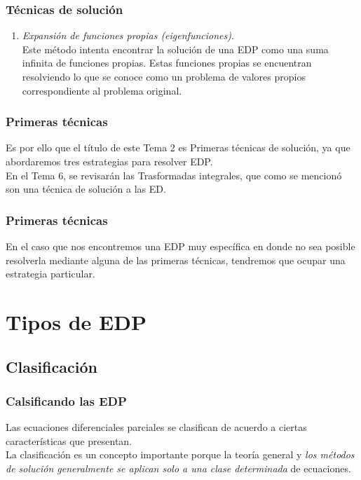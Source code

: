 \documentclass[12pt]{beamer}
\begin{document}
\begin{frame}
\frametitle{Técnicas de solución}
\begin{enumerate}
\conti
\item \emph{Expansión de funciones propias (eigenfunciones)}.
\\
\bigskip
Este método intenta encontrar la solución de una EDP como una suma infinita de funciones propias. Estas funciones propias se encuentran resolviendo lo que se conoce como un problema de valores propios correspondiente al problema original.
\end{enumerate}
\end{frame}
\begin{frame}
\frametitle{Primeras técnicas}
Es por ello que el título de este Tema 2 es Primeras técnicas de solución, ya que abordaremos tres estrategias para resolver EDP.
\\
\bigskip
\pause
En el Tema 6, se revisarán las Trasformadas integrales, que como se mencionó son una técnica de solución a las ED.
\end{frame}
\begin{frame}
\frametitle{Primeras técnicas}
En el caso que nos encontremos una EDP muy específica en donde no sea posible resolverla mediante alguna de las primeras técnicas, tendremos que ocupar una estrategia particular.
\end{frame}

\section{Tipos de EDP}
\subsection{Clasificación}

\begin{frame}
\frametitle{Calsificando las EDP}
Las ecuaciones diferenciales parciales se clasifican de acuerdo a ciertas características que presentan.
\\
\bigskip
\pause
La clasificación es un concepto importante porque la teoría general y \emph{los métodos de solución generalmente se aplican solo a una clase determinada} de ecuaciones.
\end{frame}
\end{document}
